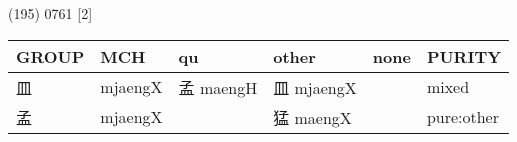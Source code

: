 \documentclass[14pt,a4paper]{scrartcl}
\begin{document}
(195) 0761 {[}2{]}

\begin{longtable}[c]{@{}llllll@{}}
\toprule
\begin{minipage}[b]{0.14\columnwidth}\raggedright\strut
GROUP
\strut\end{minipage} &
\begin{minipage}[b]{0.14\columnwidth}\raggedright\strut
MCH
\strut\end{minipage} &
\begin{minipage}[b]{0.14\columnwidth}\raggedright\strut
qu
\strut\end{minipage} &
\begin{minipage}[b]{0.14\columnwidth}\raggedright\strut
other
\strut\end{minipage} &
\begin{minipage}[b]{0.14\columnwidth}\raggedright\strut
none
\strut\end{minipage} &
\begin{minipage}[b]{0.14\columnwidth}\raggedright\strut
PURITY
\strut\end{minipage}\tabularnewline
\midrule
\endhead
\begin{minipage}[t]{0.14\columnwidth}\raggedright\strut
皿
\strut\end{minipage} &
\begin{minipage}[t]{0.14\columnwidth}\raggedright\strut
mjaengX
\strut\end{minipage} &
\begin{minipage}[t]{0.14\columnwidth}\raggedright\strut
孟 maengH
\strut\end{minipage} &
\begin{minipage}[t]{0.14\columnwidth}\raggedright\strut
皿 mjaengX
\strut\end{minipage} &
\begin{minipage}[t]{0.14\columnwidth}\raggedright\strut
\strut\end{minipage} &
\begin{minipage}[t]{0.14\columnwidth}\raggedright\strut
mixed
\strut\end{minipage}\tabularnewline
\begin{minipage}[t]{0.14\columnwidth}\raggedright\strut
孟
\strut\end{minipage} &
\begin{minipage}[t]{0.14\columnwidth}\raggedright\strut
mjaengX
\strut\end{minipage} &
\begin{minipage}[t]{0.14\columnwidth}\raggedright\strut
\strut\end{minipage} &
\begin{minipage}[t]{0.14\columnwidth}\raggedright\strut
猛 maengX
\strut\end{minipage} &
\begin{minipage}[t]{0.14\columnwidth}\raggedright\strut
\strut\end{minipage} &
\begin{minipage}[t]{0.14\columnwidth}\raggedright\strut
pure:other
\strut\end{minipage}\tabularnewline
\bottomrule
\end{longtable}
\end{document}
